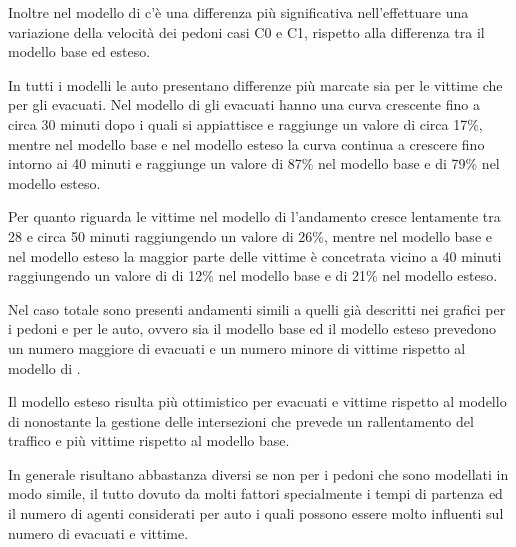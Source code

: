 Inoltre nel modello di \textcite{wang2021novel} c'è una differenza più significativa
nell'effettuare una variazione della velocità dei pedoni casi C0 e C1, 
rispetto alla differenza tra il modello base ed esteso.

In tutti i modelli le auto presentano differenze più marcate sia per le vittime che per gli evacuati. 
Nel modello di \textcite{wang2021novel} gli evacuati hanno una curva crescente fino a circa 30 minuti dopo i quali si appiattisce e raggiunge un valore di circa 17\%, 
mentre nel modello base e nel modello esteso la curva continua a crescere fino intorno ai 40 minuti e raggiunge un valore di 87\% nel modello base e di 79\% nel modello esteso.

Per quanto riguarda le vittime nel modello di \textcite{wang2021novel} l'andamento cresce lentamente tra 28 e circa 50 minuti raggiungendo un valore di 26\%, mentre nel
modello base e nel modello esteso la maggior parte delle vittime è concetrata vicino a 40 minuti raggiungendo un valore di di 12\% nel modello base e di 21\% nel modello esteso.

Nel caso totale sono presenti andamenti simili a quelli già descritti nei grafici per i pedoni e per le auto, ovvero sia il modello base ed il modello esteso 
prevedono un numero maggiore di evacuati e un numero minore di vittime rispetto al modello di \textcite{wang2021novel}.

Il modello esteso risulta più ottimistico per evacuati e vittime rispetto al modello di \textcite{wang2021novel} nonostante la gestione delle intersezioni 
che prevede un rallentamento del traffico e più vittime rispetto al modello base.

In generale risultano abbastanza diversi se non per i pedoni che sono modellati in modo simile, il tutto dovuto da molti fattori specialmente i tempi di partenza ed
il numero di agenti considerati per auto i quali possono essere molto influenti sul numero di evacuati e vittime.


\newpage



